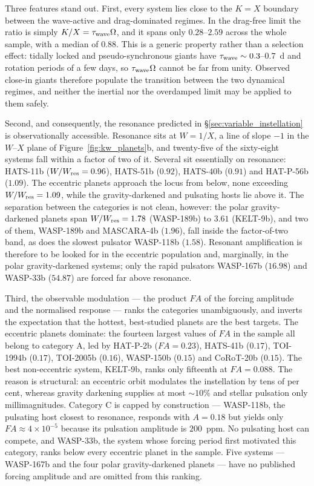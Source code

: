 \documentclass[trackchanges,twocolumn]{aastex7}
\begin{document}
Three features stand out. First, every system lies close to the $K = X$ boundary between the wave-active and drag-dominated regimes. In the drag-free limit the ratio is simply $K/X = \tau_{\rm wave}\Omega$, and it spans only $0.28$--$2.59$ across the whole sample, with a median of $0.88$. This is a generic property rather than a selection effect: tidally locked and pseudo-synchronous giants have $\tau_{\rm wave} \sim 0.3$--$0.7$~d and rotation periods of a few days, so $\tau_{\rm wave}\Omega$ cannot be far from unity. Observed close-in giants therefore populate the transition between the two dynamical regimes, and neither the inertial nor the overdamped limit may be applied to them safely.

Second, and consequently, the resonance predicted in \S\ref{sec:variable_instellation} is observationally accessible. Resonance sits at $W = 1/X$, a line of slope $-1$ in the $W$--$X$ plane of Figure~\ref{fig:kw_planets}b, and twenty-five of the sixty-eight systems fall within a factor of two of it. Several sit essentially on resonance: HATS-11b ($W/W_{\rm res} = 0.96$), HATS-51b ($0.92$), HATS-40b ($0.91$) and HAT-P-56b ($1.09$). The eccentric planets approach the locus from below, none exceeding $W/W_{\rm res} = 1.09$, while the gravity-darkened and pulsating hosts lie above it. The separation between the categories is not clean, however: the polar gravity-darkened planets span $W/W_{\rm res} = 1.78$ (WASP-189b) to $3.61$ (KELT-9b), and two of them, WASP-189b and MASCARA-4b ($1.96$), fall inside the factor-of-two band, as does the slowest pulsator WASP-118b ($1.58$). Resonant amplification is therefore to be looked for in the eccentric population and, marginally, in the polar gravity-darkened systems; only the rapid pulsators WASP-167b ($16.98$) and WASP-33b ($54.87$) are forced far above resonance.

Third, the observable modulation --- the product $FA$ of the forcing amplitude and the normalised response --- ranks the categories unambiguously, and inverts the expectation that the hottest, best-studied planets are the best targets. The eccentric planets dominate: the fourteen largest values of $FA$ in the sample all belong to category A, led by HAT-P-2b ($FA = 0.23$), HATS-41b ($0.17$), TOI-1994b ($0.17$), TOI-2005b ($0.16$), WASP-150b ($0.15$) and CoRoT-20b ($0.15$). The best non-eccentric system, KELT-9b, ranks only fifteenth at $FA = 0.088$. The reason is structural: an eccentric orbit modulates the instellation by tens of per cent, whereas gravity darkening supplies at most ${\sim}10\%$ and stellar pulsation only millimagnitudes. Category C is capped by construction --- WASP-118b, the pulsating host closest to resonance, responds with $A = 0.18$ but yields only $FA \approx 4\times10^{-5}$ because its pulsation amplitude is $200$~ppm. No pulsating host can compete, and WASP-33b, the system whose forcing period first motivated this category, ranks below every eccentric planet in the sample. Five systems --- WASP-167b and the four polar gravity-darkened planets --- have no published forcing amplitude and are omitted from this ranking.
\end{document}
